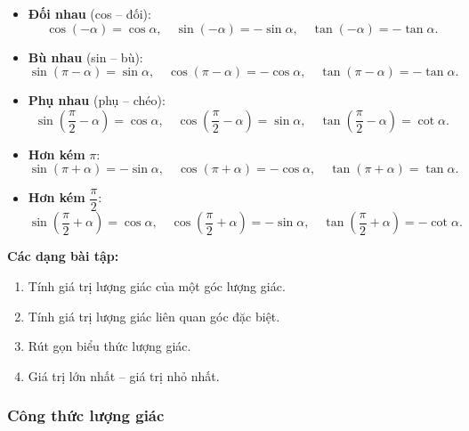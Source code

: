 \documentclass[12pt,a4paper]{article}
\begin{document}
\begin{congthuc}[title={Các góc liên quan đặc biệt}]
  \begin{itemize}
    \item \textbf{Đối nhau} (cos -- đối):
      \[
        \cos(-\alpha) = \cos\alpha,\quad
        \sin(-\alpha) = -\sin\alpha,\quad
        \tan(-\alpha) = -\tan\alpha.
      \]
    \item \textbf{Bù nhau} (sin -- bù):
      \[
        \sin(\pi - \alpha) = \sin\alpha,\quad
        \cos(\pi - \alpha) = -\cos\alpha,\quad
        \tan(\pi - \alpha) = -\tan\alpha.
      \]
    \item \textbf{Phụ nhau} (phụ -- chéo):
      \[
        \sin\!\left(\frac{\pi}{2} - \alpha\right) = \cos\alpha,\quad
        \cos\!\left(\frac{\pi}{2} - \alpha\right) = \sin\alpha,\quad
        \tan\!\left(\frac{\pi}{2} - \alpha\right) = \cot\alpha.
      \]
    \item \textbf{Hơn kém} $\pi$:
      \[
        \sin(\pi + \alpha) = -\sin\alpha,\quad
        \cos(\pi + \alpha) = -\cos\alpha,\quad
        \tan(\pi + \alpha) = \tan\alpha.
      \]
    \item \textbf{Hơn kém} $\dfrac{\pi}{2}$:
      \[
        \sin\!\left(\frac{\pi}{2} + \alpha\right) = \cos\alpha,\quad
        \cos\!\left(\frac{\pi}{2} + \alpha\right) = -\sin\alpha,\quad
        \tan\!\left(\frac{\pi}{2} + \alpha\right) = -\cot\alpha.
      \]
  \end{itemize}
\end{congthuc}

\medskip\noindent\textbf{Các dạng bài tập:}
\begin{enumerate}[label=\textbf{Dạng \arabic*:}, leftmargin=*, align=left]
  \item Tính giá trị lượng giác của một góc lượng giác.
  \item Tính giá trị lượng giác liên quan góc đặc biệt.
  \item Rút gọn biểu thức lượng giác.
  \item Giá trị lớn nhất -- giá trị nhỏ nhất.
\end{enumerate}

\subsubsection{Công thức lượng giác}
\end{document}
